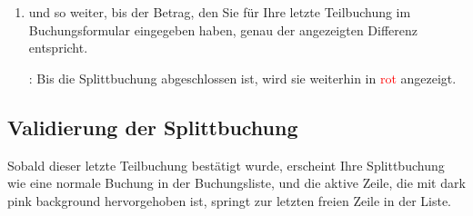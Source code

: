 \begin{enumerate}
	\item und so weiter, bis der Betrag, den Sie für Ihre letzte Teilbuchung im Buchungsformular eingegeben haben, genau der angezeigten Differenz entspricht.
	
	\Note{}: Bis die Splittbuchung abgeschlossen ist, wird sie weiterhin in \textcolor{red}{rot} angezeigt.
\end{enumerate}


\subsection{Validierung der Splittbuchung\label{transactions-breakdown-validation}}

Sobald dieser letzte Teilbuchung bestätigt wurde, erscheint Ihre Splittbuchung wie eine normale Buchung in der Buchungsliste, und die aktive Zeile, die mit {\setlength{\fboxsep}{2pt}\colorbox[RGB]{245,155,155}{dark pink background}} hervorgehoben ist, springt zur letzten freien Zeile in der Liste.

